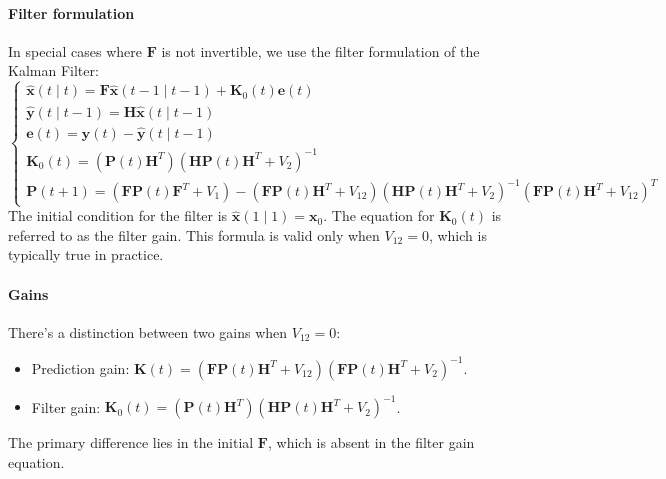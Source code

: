 \paragraph*{Filter formulation}
In special cases where $\mathbf{F}$ is not invertible, we use the filter formulation of the Kalman Filter:
\[\begin{cases}
    \hat{\mathbf{x}}(t\mid t)=\mathbf{F}\hat{\mathbf{x}}(t-1\mid t-1)+\mathbf{K}_0(t)\mathbf{e}(t) \\
    \hat{\mathbf{y}}(t\mid t-1)=\mathbf{H}\hat{\mathbf{x}}(t\mid t-1) \\
    \mathbf{e}(t)=\mathbf{y}(t)-\hat{\mathbf{y}}(t\mid t-1) \\
    \mathbf{K}_0(t)=\left(\mathbf{P}(t)\mathbf{H}^T\right)\left(\mathbf{HP}(t)\mathbf{H}^T+V_2\right)^{-1} \\
    \mathbf{P}(t+1)=\left(\mathbf{FP}(t)\mathbf{F}^T+V_1\right)-\left(\mathbf{FP}(t)\mathbf{H}^T+V_{12}\right)\left(\mathbf{HP}(t)\mathbf{H}^T+V_{2}\right)^{-1}\left(\mathbf{FP}(t)\mathbf{H}^T+V_{12}\right)^T
\end{cases}\]
The initial condition for the filter is $\hat{\mathbf{x}}(1\mid 1)=\mathbf{x}_0$. 
The equation for $\mathbf{K}_0(t)$ is referred to as the filter gain.
This formula is valid only when $V_{12}=0$, which is typically true in practice.

\paragraph*{Gains}
There's a distinction between two gains when $V_{12}=0$: 
\begin{itemize}
    \item Prediction gain: $\mathbf{K}(t)=\left(\mathbf{FP}(t)\mathbf{H}^T+V_{12}\right)\left(\mathbf{FP}(t)\mathbf{H}^T+V_2\right)^{-1}$.
    \item Filter gain: $\mathbf{K}_0(t)=\left(\mathbf{P}(t)\mathbf{H}^T\right)\left(\mathbf{HP}(t)\mathbf{H}^T+V_2\right)^{-1}$.
\end{itemize}
The primary difference lies in the initial $\mathbf{F}$, which is absent in the filter gain equation.

